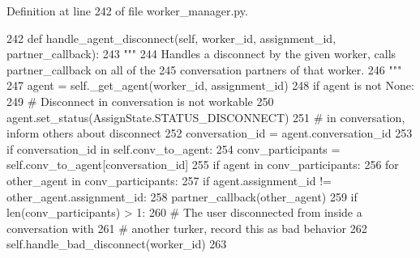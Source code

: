 Definition at line 242 of file worker\+\_\+manager.\+py.


\begin{DoxyCode}
242     \textcolor{keyword}{def }handle\_agent\_disconnect(self, worker\_id, assignment\_id, partner\_callback):
243         \textcolor{stringliteral}{"""}
244 \textcolor{stringliteral}{        Handles a disconnect by the given worker, calls partner\_callback on all of the}
245 \textcolor{stringliteral}{        conversation partners of that worker.}
246 \textcolor{stringliteral}{        """}
247         agent = self.\_get\_agent(worker\_id, assignment\_id)
248         \textcolor{keywordflow}{if} agent \textcolor{keywordflow}{is} \textcolor{keywordflow}{not} \textcolor{keywordtype}{None}:
249             \textcolor{comment}{# Disconnect in conversation is not workable}
250             agent.set\_status(AssignState.STATUS\_DISCONNECT)
251             \textcolor{comment}{# in conversation, inform others about disconnect}
252             conversation\_id = agent.conversation\_id
253             \textcolor{keywordflow}{if} conversation\_id \textcolor{keywordflow}{in} self.conv\_to\_agent:
254                 conv\_participants = self.conv\_to\_agent[conversation\_id]
255                 \textcolor{keywordflow}{if} agent \textcolor{keywordflow}{in} conv\_participants:
256                     \textcolor{keywordflow}{for} other\_agent \textcolor{keywordflow}{in} conv\_participants:
257                         \textcolor{keywordflow}{if} agent.assignment\_id != other\_agent.assignment\_id:
258                             partner\_callback(other\_agent)
259                 \textcolor{keywordflow}{if} len(conv\_participants) > 1:
260                     \textcolor{comment}{# The user disconnected from inside a conversation with}
261                     \textcolor{comment}{# another turker, record this as bad behavior}
262                     self.handle\_bad\_disconnect(worker\_id)
263 
\end{DoxyCode}
\mbox{\label{classparlai_1_1mturk_1_1core_1_1legacy__2018_1_1worker__manager_1_1WorkerManager_adf464b2fc2ae8ab451ad74c71dc6eab9}} 
